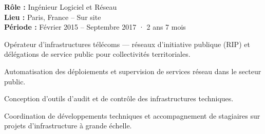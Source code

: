 \begin{cvgroup}

\begin{cvmetadata}
\textbf{Rôle :} Ingénieur Logiciel et Réseau \\
\textbf{Lieu :} Paris, France – Sur site \\
\textbf{Période :} Février 2015 – Septembre 2017 · 2 ans 7 mois
\end{cvmetadata}

\begin{cvprojectsummary}
Opérateur d'infrastructures télécoms — réseaux d'initiative publique (RIP) et délégations de service public pour collectivités territoriales.
\end{cvprojectsummary}


\begin{cvdetailmissions}
  \item {Automatisation des déploiements et supervision de services réseau dans le secteur public.}
  \item {Conception d'outils d'audit et de contrôle des infrastructures techniques.}
  \item {Coordination de développements techniques et accompagnement de stagiaires sur projets d'infrastructure à grande échelle.}
\end{cvdetailmissions}
\end{cvgroup}
